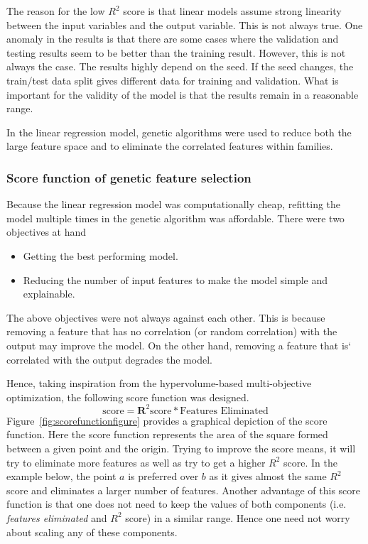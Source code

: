 \documentclass[11pt]{article}
\begin{document}
The reason for the low $R^2$ score is that linear models assume strong linearity between the input variables and the output variable.
This is not always true.
One anomaly in the results is that there are some cases where the validation and testing results seem to be better than the training result.
However, this is not always the case. 
The results highly depend on the seed.
If the seed changes, the train/test data split gives different data for training and validation.
What is important for the validity of the model is that the results remain in a reasonable range.

In the linear regression model,  genetic algorithms were used to reduce both the large feature space and to eliminate the correlated features within families. 

\subsubsection{Score function of genetic feature selection}
\label{GenerationScoringFunction}
Because the linear regression model was computationally cheap, refitting the model multiple times in the genetic algorithm was affordable.
There were two objectives at hand
\begin{itemize}
\item Getting the best performing model.
\item Reducing the number of input features to make the model simple and explainable.
\end{itemize}
The above objectives were not always against each other.
This is because removing a feature that has no correlation (or random correlation) with the output may improve the model. On the other hand, removing a feature that is` correlated with the output degrades the model.

Hence, taking inspiration from the hypervolume-based multi-objective optimization, the following score function was designed.
$$
\textrm{score} = \mathbf{R}^2 \textrm{score} * \textrm{Features Eliminated}
$$
Figure~\ref{fig:scorefunctionfigure} provides a graphical depiction of the score function.
Here the score function represents the area of the square formed between a given point and the origin.
Trying to improve the score means,  it will try to eliminate more features as well as try to get a higher $R^2$ score.
In the example below,  the point $a$ is preferred over $b$ as it gives almost the same $R^2$ score and eliminates a larger number of features.
Another advantage of this score function is that one does not need to keep the values of both components (i.e. \textit{features eliminated} and \textit{$R^2$} score) in a similar range.
Hence one need not worry about scaling any of these components.
\end{document}
